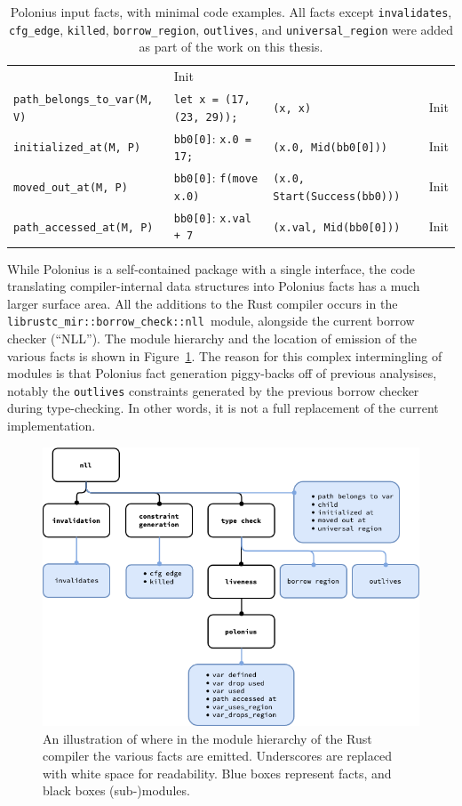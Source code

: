 \documentclass[11pt,a4paper,twoside,openany]{report}
\newcommand{\InRust}[1]{\texttt{#1}}
\newcommand{\InDatalog}[1]{\texttt{#1}}
\begin{document}
{\begin{table}[h]
\begin{tabular}{@{}l l@{} l@{} @{}l@{}}
       & Init  \\
  \InDatalog{path_belongs_to_var(M, V)} & \InRust{let x = (17, (23, 29));} & \InRust{(x, x)} & Init  \\
  \InDatalog{initialized_at(M, P)} & \InRust{bb0[0]}: \InRust{x.0 = 17;} & \InRust{(x.0, Mid(bb0[0]))} & Init  \\
  \InDatalog{moved_out_at(M, P)} & \InRust{bb0[0]}: \InRust{f(move x.0)} & \InRust{(x.0, Start(Success(bb0)))} & Init  \\
  \InDatalog{path_accessed_at(M, P)} & \InRust{bb0[0]}: \InRust{x.val + 7} & \InRust{(x.val, Mid(bb0[0]))} & Init
\end{tabular}
\caption[Input Facts to Polonius]{Polonius input facts, with minimal code
  examples. All facts except \texttt{invalidates}, \texttt{cfg\_edge},
  \texttt{killed}, \texttt{borrow\_region}, \texttt{outlives}, and
  \texttt{universal\_region} were added as part of the work on this thesis.}
  \label{tab:input-facts}
\end{table}%
}

While Polonius is a self-contained package with a single interface, the code
translating compiler-internal data structures into Polonius facts has a much
larger surface area. All the additions to the Rust compiler occurs in the
\texttt{librustc\_mir::borrow\_check::nll}~module, alongside the current borrow
checker (``NLL''). The module hierarchy and the location of emission of the
various facts is shown in Figure~\ref{fig:fact-module-hierarchy}. The reason for
this complex intermingling of modules is that Polonius fact generation
piggy-backs off of previous analysises, notably the \texttt{outlives}
constraints generated by the previous borrow checker during type-checking. In
other words, it is not a full replacement of the current implementation.

\begin{figure}
  \includegraphics[width=0.9\linewidth]{Graphs/rustc-module-structure}
  \caption[Polonius In Rust's Module Hierarchy]{An illustration of where in the
    module hierarchy of the Rust compiler the various facts are emitted.
    Underscores are replaced with white space for readability. Blue boxes
    represent facts, and black boxes (sub-)modules.}
  \label{fig:fact-module-hierarchy}
\end{figure}
\end{document}
